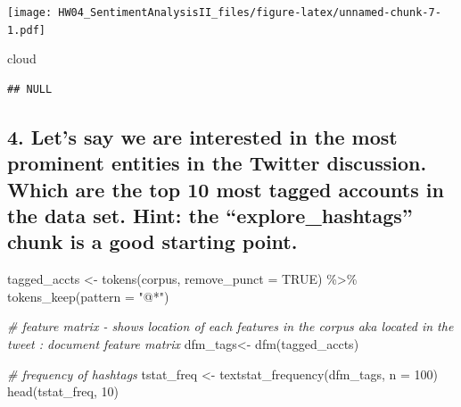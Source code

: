 \documentclass[
]{article}
\newenvironment{Shaded}{\begin{snugshade}}{\end{snugshade}}
\newcommand{\AttributeTok}[1]{\textcolor[rgb]{0.77,0.63,0.00}{#1}}
\newcommand{\CommentTok}[1]{\textcolor[rgb]{0.56,0.35,0.01}{\textit{#1}}}
\newcommand{\ConstantTok}[1]{\textcolor[rgb]{0.00,0.00,0.00}{#1}}
\newcommand{\DecValTok}[1]{\textcolor[rgb]{0.00,0.00,0.81}{#1}}
\newcommand{\FunctionTok}[1]{\textcolor[rgb]{0.00,0.00,0.00}{#1}}
\newcommand{\NormalTok}[1]{#1}
\newcommand{\OtherTok}[1]{\textcolor[rgb]{0.56,0.35,0.01}{#1}}
\newcommand{\SpecialCharTok}[1]{\textcolor[rgb]{0.00,0.00,0.00}{#1}}
\newcommand{\StringTok}[1]{\textcolor[rgb]{0.31,0.60,0.02}{#1}}
\begin{document}
\texttt{[image: HW04\_SentimentAnalysisII\_files/figure-latex/unnamed-chunk-7-1.pdf]}

\begin{Shaded}
\begin{Highlighting}[]
\NormalTok{cloud}
\end{Highlighting}
\end{Shaded}

\begin{verbatim}
## NULL
\end{verbatim}

\hypertarget{lets-say-we-are-interested-in-the-most-prominent-entities-in-the-twitter-discussion.-which-are-the-top-10-most-tagged-accounts-in-the-data-set.-hint-the-explore_hashtags-chunk-is-a-good-starting-point.}{%
\subsection{4. Let's say we are interested in the most prominent
entities in the Twitter discussion. Which are the top 10 most tagged
accounts in the data set. Hint: the ``explore\_hashtags'' chunk is a
good starting
point.}\label{lets-say-we-are-interested-in-the-most-prominent-entities-in-the-twitter-discussion.-which-are-the-top-10-most-tagged-accounts-in-the-data-set.-hint-the-explore_hashtags-chunk-is-a-good-starting-point.}}

\begin{Shaded}
\end{Shaded}

\begin{Shaded}
\begin{Highlighting}[]
\NormalTok{tagged\_accts }\OtherTok{\textless{}{-}} \FunctionTok{tokens}\NormalTok{(corpus, }\AttributeTok{remove\_punct =} \ConstantTok{TRUE}\NormalTok{) }\SpecialCharTok{\%\textgreater{}\%} 
               \FunctionTok{tokens\_keep}\NormalTok{(}\AttributeTok{pattern =} \StringTok{"@*"}\NormalTok{)}

\CommentTok{\# feature matrix {-} shows location of each features in the corpus aka located in the tweet : document feature matrix}
\NormalTok{dfm\_tags}\OtherTok{\textless{}{-}} \FunctionTok{dfm}\NormalTok{(tagged\_accts)}

\CommentTok{\# frequency of hashtags}
\NormalTok{tstat\_freq }\OtherTok{\textless{}{-}} \FunctionTok{textstat\_frequency}\NormalTok{(dfm\_tags, }\AttributeTok{n =} \DecValTok{100}\NormalTok{)}
\FunctionTok{head}\NormalTok{(tstat\_freq, }\DecValTok{10}\NormalTok{)}
\end{Highlighting}
\end{Shaded}
\end{document}
